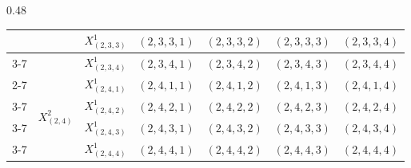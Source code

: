 \documentclass[12pt]{article}
\begin{document}
\begin{table}[p]
\begin{subtable}[t]{0.48\textwidth}
{\begin{tabular}{|c|c|c|c|c|c|c|}
                                  &                                  & $X_{(2,3,3)}^{1}$ & \cellcolor{red!40}$(2,3,3,1)$ & \cellcolor{blue!40}$(2,3,3,2)$ & \cellcolor{green!40}$(2,3,3,3)$ &\cellcolor{yellow!40} $(2,3,3,4)$ \\ \cline{3-7}
                                  &                                  & $X_{(2,3,4)}^{1}$ & \cellcolor{blue!40}$(2,3,4,1)$ & \cellcolor{green!40} $(2,3,4,2)$ & \cellcolor{yellow!40} $(2,3,4,3)$ & \cellcolor{red!40}$(2,3,4,4)$ \\ \cline{2-7}
                                  & \multirow{4}{*}{$X_{(2,4)}^{2}$} & $X_{(2,4,1)}^{1}$ & \cellcolor{yellow!40}$(2,4,1,1)$ &\cellcolor{red!40} $(2,4,1,2)$ &\cellcolor{blue!40} $(2,4,1,3)$ &\cellcolor{green!40} $(2,4,1,4)$ \\ \cline{3-7}
                                  &                                  & $X_{(2,4,2)}^{1}$ & \cellcolor{red!40}$(2,4,2,1)$ &\cellcolor{blue!40} $(2,4,2,2)$ &\cellcolor{green!40} $(2,4,2,3)$ &\cellcolor{yellow!40} $(2,4,2,4)$ \\ \cline{3-7}
                                  &                                  & $X_{(2,4,3)}^{1}$ & \cellcolor{blue!40} $(2,4,3,1)$ & \cellcolor{green!40} $(2,4,3,2)$ & \cellcolor{yellow!40} $(2,4,3,3)$ & \cellcolor{red!40}$(2,4,3,4)$ \\ \cline{3-7}
                                  &                                  & $X_{(2,4,4)}^{1}$ & \cellcolor{green!40}$(2,4,4,1)$ &\cellcolor{yellow!40} $(2,4,4,2)$ &\cellcolor{red!40} $(2,4,4,3)$ &\cellcolor{blue!40} $(2,4,4,4)$ \\ \hline
  \end{tabular}%
  }%
\end{subtable}%
\hfill

\end{table}
\end{document}
